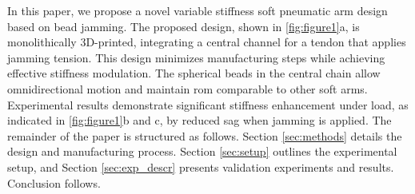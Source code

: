 In this paper, we propose a novel variable stiffness soft pneumatic arm design based on bead jamming. The proposed design, shown in \cref{fig:figure1}a, is monolithically 3D-printed, integrating a central channel for a tendon that applies jamming tension. This design minimizes manufacturing steps while achieving effective stiffness modulation. The spherical beads in the central chain allow omnidirectional motion and maintain \gls{rom} comparable to other soft arms. Experimental results demonstrate significant stiffness enhancement under load, as indicated in \cref{fig:figure1}b and c, by reduced sag when jamming is applied. The remainder of the paper is structured as follows. Section \ref{sec:methods} details the design and manufacturing process. Section \ref{sec:setup} outlines the experimental setup, and Section \ref{sec:exp_descr} presents validation experiments and results. Conclusion follows.



